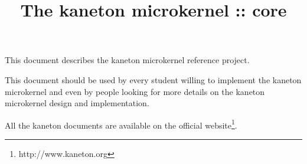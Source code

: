 %
%
%
%
%
%

%
%

%
%

\def\path{../..}

%
%



%
%


%
%

\title{The kaneton microkernel :: core \\
       \version
       \logo}

%
%



%
%

\maketitle

%
%

This document describes the kaneton microkernel reference project.

\-

This document should be used by every student willing to implement the
kaneton microkernel and even by people looking for more details on
the kaneton microkernel design and implementation.

\-

All the kaneton documents are available on
  the official website\footnote{http://www.kaneton.org}.

%
%

\tableofcontents

%
%

\indentation{}

%
%















